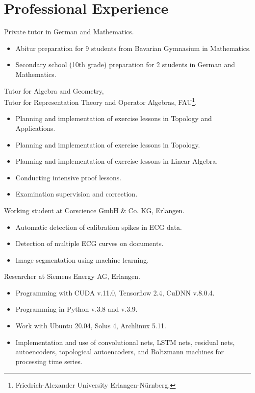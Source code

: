 \documentclass[a4paper, 12pt]{article}
\newcommand{\years}[1]{\marginnote{\scriptsize #1}}
\begin{document}
	\section*{Professional Experience}
	\years{2024--25} Private tutor in German and Mathematics.
	\begin{itemize}
		\item Abitur preparation for 9 students from Bavarian Gymnasium in Mathematics.
		\item Secondary school (10th grade) preparation for 2 students in German and Mathematics.
	\end{itemize}
	\years{2023--24} Tutor for Algebra and Geometry, \\ Tutor for Representation Theory and Operator Algebras, FAU\footnote{Friedrich-Alexander University Erlangen-Nürnberg.}.
	\begin{itemize}
		\item Planning and implementation of exercise lessons in \glqq Topology and Applications\grqq.
		\item Planning and implementation of exercise lessons in \glqq Topology\grqq.
		\item Planning and implementation of exercise lessons in \glqq Linear Algebra\grqq.
		\item Conducting intensive proof lessons.
		\item Examination supervision and correction.
	\end{itemize}
	\years{2021--22} Working student at Corscience GmbH \& Co. KG, Erlangen.
	\begin{itemize}
		\item Automatic detection of calibration spikes in ECG data.
		\item Detection of multiple ECG curves on documents.
		\item Image segmentation using machine learning.
	\end{itemize}
	\years{2019--21} Researcher at Siemens Energy AG, Erlangen.
	\begin{itemize}
		\item Programming with CUDA v.11.0, Tensorflow 2.4, CuDNN v.8.0.4.
		\item Programming in Python v.3.8 and v.3.9.
		\item Work with Ubuntu 20.04, Solus 4, Archlinux 5.11.
		\item Implementation and use of convolutional nets, LSTM nets, residual nets, autoencoders, topological autoencoders, and Boltzmann machines for processing time series.
	\end{itemize}
\end{document}
